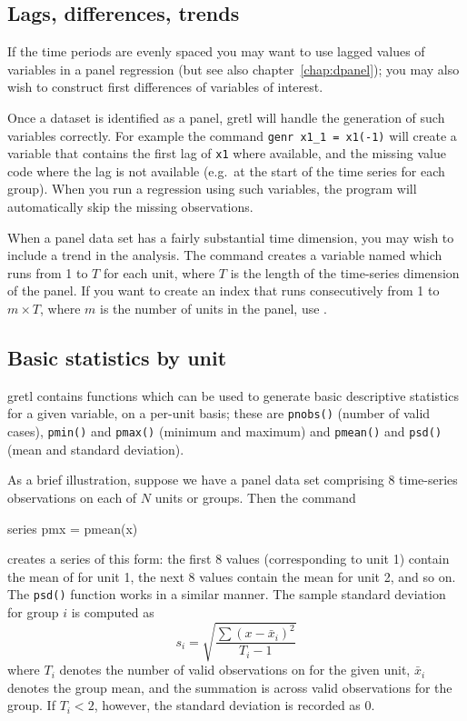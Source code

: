 \subsection{Lags, differences, trends}
\label{panel-lagged}

If the time periods are evenly spaced you may want to use lagged
values of variables in a panel regression (but see also
chapter~\ref{chap:dpanel}); you may also wish to construct first
differences of variables of interest.

Once a dataset is identified as a panel, gretl will handle the
generation of such variables correctly.  For example the command
\verb+genr x1_1 = x1(-1)+ will create a variable that contains the
first lag of \verb+x1+ where available, and the missing value code
where the lag is not available (e.g.\ at the start of the time series
for each group).  When you run a regression using such variables, the
program will automatically skip the missing observations.

When a panel data set has a fairly substantial time dimension, you may
wish to include a trend in the analysis.  The command  
creates a variable named  which runs from 1 to $T$ for
each unit, where $T$ is the length of the time-series dimension of the
panel.  If you want to create an index that runs consecutively from 1
to $m\times T$, where $m$ is the number of units in the panel, use
.

\subsection{Basic statistics by unit}
\label{panel-stats}

gretl contains functions which can be used to generate basic
descriptive statistics for a given variable, on a per-unit basis;
these are \texttt{pnobs()} (number of valid cases), \texttt{pmin()}
and \texttt{pmax()} (minimum and maximum) and \texttt{pmean()} and
\texttt{psd()} (mean and standard deviation).

As a brief illustration, suppose we have a panel data set comprising 8
time-series observations on each of $N$ units or groups.  Then the
command
%
\begin{code}
series pmx = pmean(x)
\end{code}
%
creates a series of this form: the first 8 values (corresponding to
unit 1) contain the mean of  for unit 1, the next 8 values
contain the mean for unit 2, and so on.  The \texttt{psd()} function
works in a similar manner.  The sample standard deviation for group
$i$ is computed as
\[
s_i = \sqrt{\frac{\sum(x-\bar{x}_i)^2}{T_i-1}}
\]
where $T_i$ denotes the number of valid observations on 
for the given unit, $\bar{x}_i$ denotes the group mean, and the
summation is across valid observations for the group.  If $T_i < 2$,
however, the standard deviation is recorded as 0.

